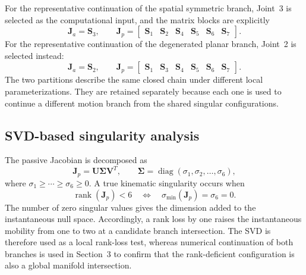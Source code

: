 ﻿\documentclass[a4paper,fleqn]{cas-sc}
\begin{document}
For the representative continuation of the spatial symmetric branch,
Joint~3 is selected as the computational input, and the matrix blocks are
explicitly
\begin{equation}
\mathbf J_a=\mathbf S_3,\qquad
\mathbf J_p=
\begin{bmatrix}
\mathbf S_1&\mathbf S_2&\mathbf S_4&
\mathbf S_5&\mathbf S_6&\mathbf S_7
\end{bmatrix}.
\label{eq:jacobian_partition_spatial}
\end{equation}
For the representative continuation of the degenerated planar branch,
Joint~2 is selected instead:
\begin{equation}
\mathbf J_a=\mathbf S_2,\qquad
\mathbf J_p=
\begin{bmatrix}
\mathbf S_1&\mathbf S_3&\mathbf S_4&
\mathbf S_5&\mathbf S_6&\mathbf S_7
\end{bmatrix}.
\label{eq:jacobian_partition_planar}
\end{equation}
The two partitions describe the same closed chain under different local
parameterizations. They are retained separately because each one is used to
continue a different motion branch from the shared singular configurations.

\subsection{SVD-based singularity analysis}

The passive Jacobian is decomposed as
\begin{equation}
\mathbf J_p=\mathbf U\boldsymbol{\Sigma}\mathbf V^T,\qquad
\boldsymbol{\Sigma}=\operatorname{diag}
(\sigma_1,\sigma_2,\ldots,\sigma_6),
\label{eq:svd}
\end{equation}
where \(\sigma_1\geq\cdots\geq\sigma_6\geq0\). A true kinematic singularity
occurs when
\begin{equation}
\operatorname{rank}(\mathbf J_p)<6
\quad\Longleftrightarrow\quad
\sigma_{\min}(\mathbf J_p)=\sigma_6=0.
\label{eq:singularity_criterion}
\end{equation}
The number of zero singular values gives the dimension added to the
instantaneous null space. Accordingly, a rank loss by one raises the
instantaneous mobility from one to two at a candidate branch intersection.
The SVD is therefore used as a local rank-loss test, whereas numerical
continuation of both branches is used in Section~3 to confirm that the
rank-deficient configuration is also a global manifold intersection.
\end{document}
